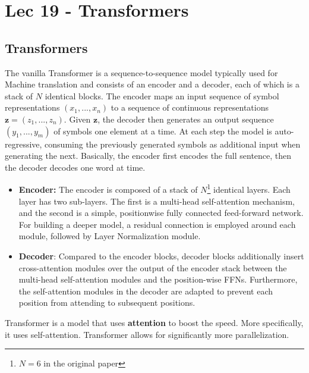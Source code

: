 \chapter{Lec 19 - Transformers}

\section{Transformers}
The vanilla Transformer is a sequence-to-sequence model typically used for Machine translation and consists of an encoder and a decoder, each of which is a stack of $N$ identical blocks. The encoder maps an input sequence of symbol representations $(x_1, ..., x_n)$ to a sequence of continuous representations $\textbf{z} = (z_1, ..., z_n)$. Given $\textbf{z}$, the decoder then generates an output sequence $(y_1, ..., y_m)$ of symbols one element at a time. At each step the model is auto-regressive, consuming the previously generated symbols as additional input when generating the next. Basically, the encoder first encodes the full sentence, then the decoder decodes one word at time.
\begin{itemize}
    \item \textbf{Encoder:} The encoder is composed of a stack of $N$\footnote{$N=6$ in the original paper} identical layers. Each layer has two sub-layers. The first is a multi-head self-attention mechanism, and the second is a simple, positionwise fully connected feed-forward network. For building a deeper model, a residual connection is employed around each module, followed by Layer Normalization module.

    \item \textbf{Decoder}: Compared to the encoder blocks, decoder blocks additionally insert cross-attention modules over the output of the encoder stack between the multi-head self-attention modules and the position-wise FFNs. Furthermore, the self-attention modules in the decoder are adapted to prevent each position from attending to subsequent positions.
\end{itemize}
Transformer is a model that uses \textbf{attention} to boost the speed. More specifically, it uses self-attention. Transformer allows for significantly more parallelization.
